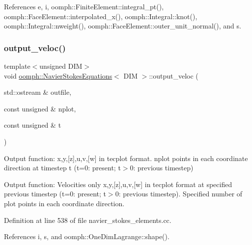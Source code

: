 References e, i, oomph\+::\+Finite\+Element\+::integral\+\_\+pt(), oomph\+::\+Face\+Element\+::interpolated\+\_\+x(), oomph\+::\+Integral\+::knot(), oomph\+::\+Integral\+::nweight(), oomph\+::\+Face\+Element\+::outer\+\_\+unit\+\_\+normal(), and s.

\mbox{\label{classoomph_1_1NavierStokesEquations_ab2eccb3a38f6d342002028708449cc53}} 
\subsubsection{\texorpdfstring{output\+\_\+veloc()}{output\_veloc()}}
{\footnotesize\ttfamily template$<$unsigned D\+IM$>$ \\
void \hyperlink{classoomph_1_1NavierStokesEquations}{oomph\+::\+Navier\+Stokes\+Equations}$<$ D\+IM $>$\+::output\+\_\+veloc (\begin{DoxyParamCaption}\item[{std\+::ostream \&}]{outfile,  }\item[{const unsigned \&}]{nplot,  }\item[{const unsigned \&}]{t }\end{DoxyParamCaption})}



Output function\+: x,y,\mbox{[}z\mbox{]},u,v,\mbox{[}w\mbox{]} in tecplot format. nplot points in each coordinate direction at timestep t (t=0\+: present; t$>$0\+: previous timestep) 

Output function\+: Velocities only x,y,\mbox{[}z\mbox{]},u,v,\mbox{[}w\mbox{]} in tecplot format at specified previous timestep (t=0\+: present; t$>$0\+: previous timestep). Specified number of plot points in each coordinate direction. 

Definition at line 538 of file navier\+\_\+stokes\+\_\+elements.\+cc.



References i, s, and oomph\+::\+One\+Dim\+Lagrange\+::shape().

\mbox{\label{classoomph_1_1NavierStokesEquations_ae3bb4e367f7476e7bd3a3648bd8ce38b}} 
